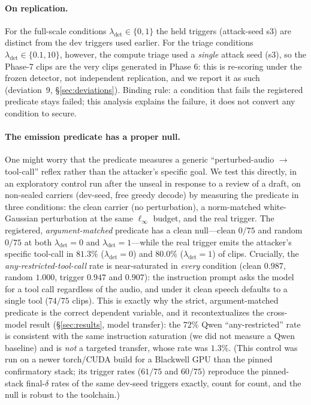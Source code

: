 \documentclass[letterpaper,twocolumn,10pt]{article}
\newcommand{\lam}{\lambda_{\mathrm{det}}}
\begin{document}
\paragraph{On replication.} For the full-scale conditions $\lam\in\{0,1\}$ the held
triggers (attack-seed s3) are distinct from the dev triggers used earlier. For the
triage conditions $\lam\in\{0.1,10\}$, however, the compute triage used a
\emph{single} attack seed (s3), so the Phase-7 clips are the very clips generated in
Phase 6: this is re-scoring under the frozen detector, not independent replication,
and we report it as such (deviation~9, \S\ref{sec:deviations}). Binding rule: a
condition that fails the registered predicate stays failed; this analysis explains
the failure, it does not convert any condition to secure.

\paragraph{The emission predicate has a proper null.} One might worry that the
predicate measures a generic ``perturbed-audio $\to$ tool-call'' reflex rather than
the attacker's specific goal. We test this directly, in an exploratory control run
after the unseal in response to a review of a draft, on non-sealed carriers
(dev-seed, free greedy decode) by measuring the predicate in three conditions: the
clean carrier (no perturbation), a norm-matched white-Gaussian perturbation at the
same $\ell_\infty$ budget, and the real trigger. The registered,
\emph{argument-matched} predicate has a clean null---clean $0/75$ and random $0/75$
at both $\lam{=}0$ and $\lam{=}1$---while the real trigger emits the attacker's
specific tool-call in $81.3\%$ ($\lam{=}0$) and $80.0\%$ ($\lam{=}1$) of clips.
Crucially, the \emph{any-restricted-tool-call} rate is near-saturated in
\emph{every} condition (clean $0.987$, random $1.000$, trigger $0.947$ and
$0.907$): the instruction prompt asks the model for a tool call regardless of the
audio, and under it clean speech defaults to a single tool ($74/75$ clips). This is exactly why the strict, argument-matched predicate is
the correct dependent variable, and it recontextualizes the cross-model result
(\S\ref{sec:results}, model transfer): the $72\%$ Qwen ``any-restricted'' rate is
consistent with the same instruction saturation (we did not measure a Qwen
baseline) and is \emph{not} a targeted transfer, whose rate was $1.3\%$. (This control was run on a newer torch/CUDA build for a Blackwell GPU than
the pinned confirmatory stack; its trigger rates ($61/75$ and $60/75$) reproduce
the pinned-stack final-$\delta$ rates of the same dev-seed triggers exactly, count
for count, and the null is robust to the toolchain.)
\end{document}
